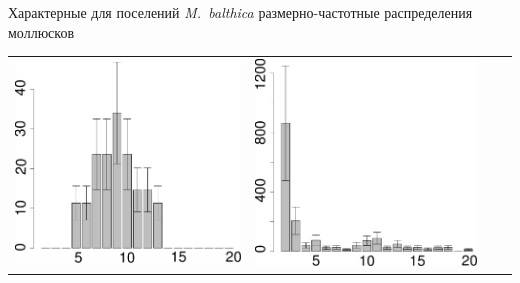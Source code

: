 \documentclass{beamer}
\begin{document}
\begin{frame}{Характерные для поселений {\it M.~balthica} размерно-частотные распределения моллюсков}
\begin{tabularx}{\linewidth}{XX|XX}
			\includegraphics[width=\linewidth]{high_beatch2_1992_.pdf} &
			\includegraphics[width=\linewidth]{zostera_zone2_1998_.pdf}  \\

\end{tabularx}
\end{frame}
\end{document}

